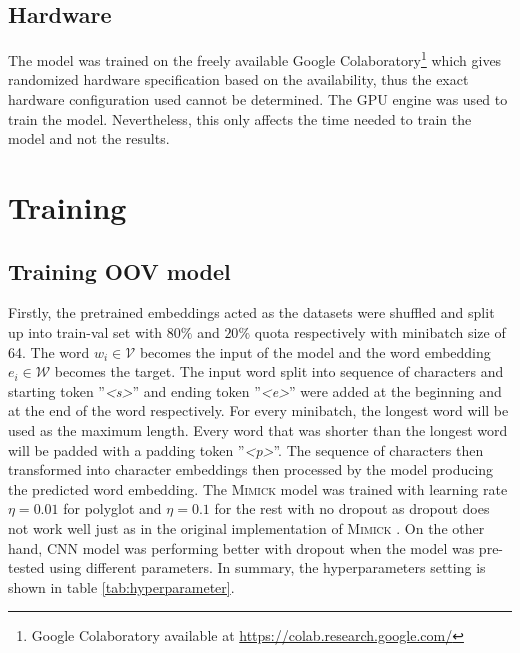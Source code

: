     \subsection{Hardware}
        The model was trained on the freely available Google
        Colaboratory\footnote{Google Colaboratory available at
        \url{https://colab.research.google.com/}} which gives
        randomized hardware specification based on the availability,
        thus the exact hardware configuration used cannot be
        determined. The GPU engine was used to train the model.
        Nevertheless, this only affects the time needed to train the
        model and not the results.

\section{Training}
    \subsection{Training OOV model}
        Firstly, the pretrained embeddings acted as the datasets were
        shuffled and split up into train-val set with $80\%$ and
        $20\%$ quota respectively with minibatch size of 64. The word
        $w_i \in \mathcal{V}$ becomes the input of the model and the
        word embedding $e_i \in \mathcal{W}$ becomes the target. The
        input word split into sequence of characters and starting
        token ''\textit{\textless s\textgreater}'' and ending token
        ''\textit{\textless e\textgreater}'' were added at the beginning
        and at the end of the word respectively. For every minibatch,
        the longest word will be used as the maximum length. Every
        word that was shorter than the longest word will be padded
        with a padding token ''\textit{\textless p\textgreater}''.
        The sequence of characters then transformed into character
        embeddings then processed by the model producing the predicted
        word embedding. The \textsc{Mimick} model was trained with
        learning rate $\eta = 0.01$ for polyglot and $\eta = 0.1$ for the
        rest with no dropout as dropout does not work well just as in
        the original implementation of \textsc{Mimick}
        \citep{mimicking2017Pinter}. On the other hand, CNN model was
        performing better with dropout when the model was pre-tested
        using different parameters. In summary, the hyperparameters
        setting is shown in table \ref{tab:hyperparameter}.

